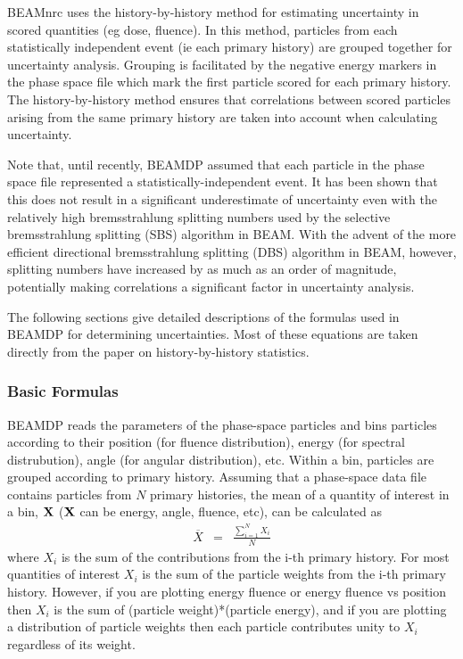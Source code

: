 \documentclass[12pt,twoside]{article}
\begin{document}
BEAMnrc uses the history-by-history method\cite{Wa02a} for estimating
uncertainty in scored quantities (eg dose, fluence).  In this method,
particles from each statistically independent event (ie each primary history)
are grouped together for uncertainty analysis.  Grouping is facilitated
by the negative energy markers in the phase space file\cite{Ro04a} which
mark the first particle scored for each primary history.  The history-by-history
method ensures that correlations between scored particles arising from the
same primary history are taken into account when calculating uncertainty.

Note that, until recently, BEAMDP assumed that each particle in the phase
space file represented a statistically-independent event.  It has
been shown\cite{Wa02a} that this does not result in a significant
underestimate of uncertainty even with the relatively high bremsstrahlung
splitting numbers used by the selective bremsstrahlung splitting (SBS)
algorithm in BEAM\cite{Ro04a}.  With the advent of the more efficient
directional bremsstrahlung splitting (DBS) algorithm\cite{Ka04a} in BEAM,
however,
splitting numbers have increased by as much as an order of magnitude,
potentially making
correlations a significant factor in uncertainty analysis.

The following
sections give detailed descriptions of the
formulas used in BEAMDP for determining uncertainties.
Most of
these equations are taken directly from the paper on history-by-history
statistics\cite{Wa02a}.

\subsubsection{ Basic Formulas }

BEAMDP reads the parameters of the phase-space particles and bins
particles
according to their position (for fluence distribution),
energy (for spectral distrubution), angle (for angular distribution), etc.
Within a bin, particles are grouped according to primary history.
Assuming that a
phase-space data file contains particles from $N$ primary histories,
the mean of a quantity of interest in a bin, ${\bf X}$ (${\bf X}$ can be
energy, angle, fluence, etc), can be calculated as
\begin{eqnarray}
\overline{X}& =&  \frac{\sum_{i=1}^{N}X_i}{N}
\end{eqnarray}
where $X_i$ is the sum of the contributions from the i-th primary history.
For most quantities of interest $X_i$ is the sum of the particle weights from
the i-th primary history.  However, if you are plotting energy fluence
or energy fluence vs position then $X_i$ is the sum of
(particle weight)*(particle energy), and
if you are plotting a distribution of particle weights then
each particle contributes unity to $X_i$ regardless of its weight.
\end{document}

